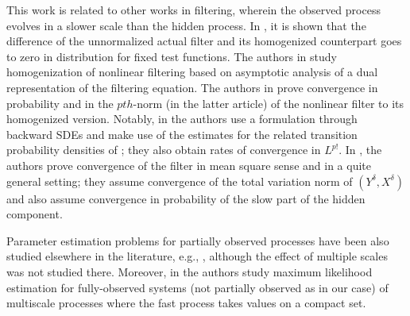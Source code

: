 \documentclass{article}
\begin{document}
This work is related to other works in filtering, wherein the observed process evolves in a slower scale than the hidden process. In \cite{Kushner}, it is shown that the difference of the unnormalized actual filter and its homogenized counterpart goes to zero in distribution for fixed test functions. The authors in \cite{BensoussanBlankenship1986,Ichihara2004} study homogenization of nonlinear filtering based on asymptotic analysis of a dual representation of the filtering equation. The authors in \cite{ParkSriSowers2008, ParkRozovskySowers2010,ParkSriSowers2011,ImkellerSriPerkowskiYeong2012} prove convergence in probability and in the $pth$-norm (in the latter article) of the nonlinear filter to its homogenized version. Notably, in \cite{ImkellerSriPerkowskiYeong2012} the authors use a formulation through backward SDEs and make use of the estimates for the related transition probability densities of \cite{PardouxVeretennikov2}; they also obtain rates of convergence in $L^{p!
 }$.  In \cite{KleptsinaLiptserSerebrovski1997}, the authors prove convergence of the filter in mean square sense and in a quite general setting; they assume convergence of the total variation norm of $(Y^{\delta},X^{\delta})$ and also assume convergence in probability of the slow part of the hidden component.

Parameter estimation problems for partially observed processes have been also studied elsewhere in the literature, e.g., \cite{Kutoyants, JamesGland1995}, although the effect
of multiple scales was not studied there. Moreover, in \cite{PapavasileiouPaviotisStuart2009} the authors study maximum likelihood estimation for fully-observed systems (not partially observed as in our case) of multiscale processes where the fast process takes values on a compact set.
\end{document}
